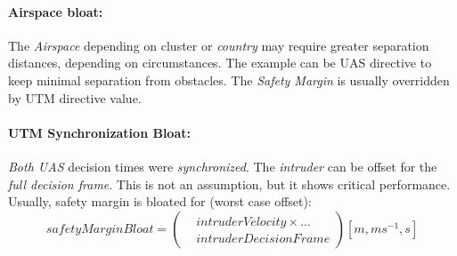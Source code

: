 \paragraph{Airspace bloat:} The \emph{Airspace} depending on cluster or \emph{country} may require greater separation distances, depending on circumstances. The example can be UAS directive to keep minimal separation from obstacles. The \emph{Safety Margin} is usually overridden by UTM directive value.

\paragraph{UTM Synchronization Bloat:} \emph{Both UAS} decision times were \emph{synchronized}. The \emph{intruder} can be offset for the \emph{full decision frame}. This is not an assumption, but it shows critical performance. Usually, safety margin is bloated for (worst case offset):
\begin{equation}\label{safetyMarginBloat}
    safetyMarginBloat = \left( \begin{aligned}
    &intruderVelocity \times\dots \\ &intruderDecisionFrame \end{aligned}\right)[m,ms^{-1},s]
\end{equation}